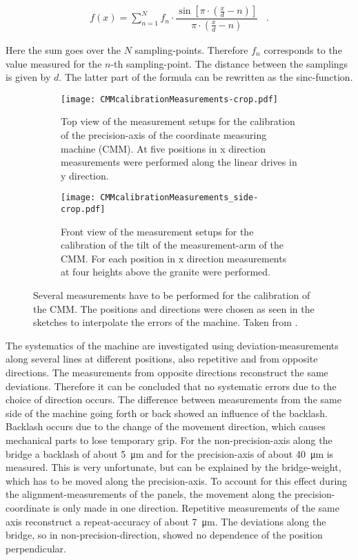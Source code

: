 \documentclass[
twoside,            %
BCOR1.4cm,          %
10pt,               %
headings=normal,    %
headsepline,        %
clearplainpage,		%
final,              %
div=14,
open=right,
bibliography=toc
]{scrreprt}
\begin{document}
\begin{align}
	f(x) = 
			\sum_{n = 1}^{N} f_{n} \cdot 
			\dfrac{
				\sin\!\left[ \pi \cdot \left( \tfrac{x}{d} - n \right) \right]
			}{
				\pi \cdot \left( \tfrac{x}{d} - n \right)
			} \;\;\; .
\end{align}

Here the sum goes over the $N$ sampling-points.
Therefore $f_{n}$ corresponds to the value measured for the $n$-th sampling-point.
The distance between the samplings is given by $d$.
The latter part of the formula can be rewritten as the sinc-function.

\begin{figure}[!h]
	\begin{subfigure}[b]{0.48\textwidth}
		\centering
		\texttt{[image: CMMcalibrationMeasurements-crop.pdf]}
		\caption{
			Top view of the measurement setups for the calibration of the precision-axis of the coordinate measuring machine (CMM).
			At five positions in x direction measurements were performed along the linear drives in y direction.
		}
		\label{CMMcalibrationMeasurements} 
	\end{subfigure}
	\hfill
	\begin{subfigure}[b]{0.48\textwidth}
		\centering
		\texttt{[image: CMMcalibrationMeasurements\_side-crop.pdf]}
		\caption{
			Front view of the measurement setups for the calibration of the tilt of the measurement-arm of the CMM.
			For each position in x direction measurements at four heights above the granite were performed.
		}
		\label{CMMcalibrationMeasurements_side} 
	\end{subfigure}
	\vspace{-2mm}
	\caption{
		Several measurements have to be performed for the calibration of the CMM.
		The positions and directions were chosen as seen in the sketches to interpolate the errors of the machine.
		Taken from \cite{neubertThesis}.
	}
\end{figure}

The systematics of the machine are investigated using deviation-measurements along several lines at different positions, also repetitive and from opposite directions.
The measurements from opposite directions reconstruct the same deviations. 
Therefore it can be concluded that no systematic errors due to the choice of direction occurs.
The difference between measurements from the same side of the machine going forth or back showed an influence of the backlash.
Backlash occurs due to the change of the movement direction, which causes mechanical parts to lose temporary grip.
For the non-precision-axis along the bridge a backlash of about \SI{5}{\micro\m} and for the precision-axis of about \SI{40}{\micro\m} is measured.
This is very unfortunate, but can be explained by the bridge-weight, which has to be moved along the precision-axis.
To account for this effect during the alignment-measurements of the panels, the movement along the precision-coordinate is only made in one direction.
Repetitive measurements of the same axis reconstruct a repeat-accuracy of about \SI{7}{\micro\m}.
The deviations along the bridge, so in non-precision-direction, showed no dependence of the position perpendicular.
\end{document}
